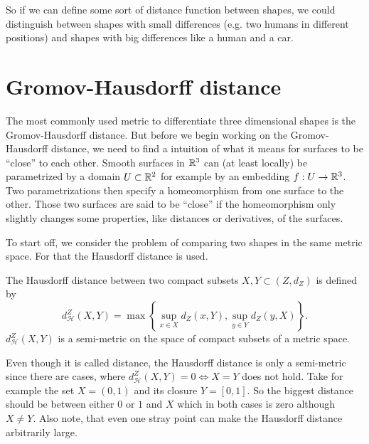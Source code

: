 So if we can define some sort of distance function between shapes, we could distinguish between shapes with small differences (e.g. two humans in different positions) and shapes with big differences like a human and a car.

\section{Gromov-Hausdorff distance}
The most commonly used metric to differentiate three dimensional shapes is the Gromov-Hausdorff distance.
But before we begin working on the Gromov-Hausdorff distance, we need to find a intuition of what it means for surfaces to be ``close'' to each other.
Smooth surfaces in $\mathbb{R}^3$ can (at least locally) be parametrized by a domain $U \subset \mathbb{R}^2$ for example by an embedding $f: U\rightarrow \mathbb{R}^3$.
Two parametrizations then specify a homeomorphism from one surface to the other.
Those two surfaces are said to be ``close'' if the homeomorphism only slightly changes some properties, like distances or derivatives, of the surfaces.

To start off, we consider the problem of comparing two shapes in the same metric space.
For that the Hausdorff distance is used.
\begin{mydef}
	The Hausdorff distance between two compact subsets $X,Y \subset (Z,d_Z)$ is defined by
	$$d^Z_\mathcal{H}(X,Y) = \max \left\{ \sup_{x \in X} d_Z(x,Y), \sup_{y \in Y} d_Z(y,X)\right\}.$$
	$d^Z_\mathcal{H}(X,Y)$ is a semi-metric on the space of compact subsets of a metric space.
\end{mydef}
Even though it is called distance, the Hausdorff distance is only a semi-metric since there are cases, where $d^Z_\mathcal{H}(X,Y) = 0 \Leftrightarrow X = Y$ does not hold.
Take for example the set $X = (0,1)$ and its closure $Y = [0,1]$.
So the biggest distance should be between either $0$ or $1$ and $X$ which in both cases is zero although $X \neq Y$.
Also note, that even one stray point can make the Hausdorff distance arbitrarily large.

